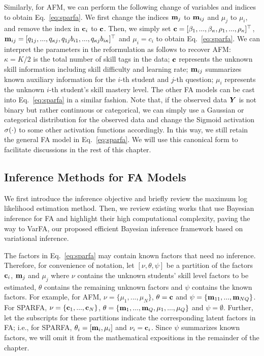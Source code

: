 Similarly, for AFM, we can perform the following change of variables and
indices to obtain Eq.~\ref{eq:sparfa}. We first change the indices ${\mathbf{m}}_j$ to
${\mathbf{m}}_{ij}$ and $\mu_j$ to $\mu_i$, and remove the index in ${\mathbf{c}}_i$ to ${\mathbf{c}}$.
Then, we simply set ${\mathbf{c}} = [\beta_1, ..., \beta_\kappa, \rho_1, ...,
    \rho_\kappa]^\top$, ${\mathbf{m}}_{ij} = [q_{1j},...,q_{\kappa j},
    q_{1j}b_{i1},...,q_{\kappa j}b_{i\kappa}]^\top$ and $\mu_{i} = c_i$ to
obtain Eq.~\ref{eq:sparfa}. We can interpret the parameters in the
reformulation as follows to recover AFM: $\kappa=K/2$ is the total number of
skill tags in the data; ${\mathbf{c}}$ represents the unknown skill information
including skill difficulty and learning rate; ${\mathbf{m}}_{ij}$ summarizes known
auxiliary information for the $i$-th student and $j$-th question; $\mu_i$
represents the unknown $i$-th student's skill mastery level. The other FA
models can be cast into Eq.~\ref{eq:sparfa} in a similar fashion. Note that, if
the observed data ${\bm{Y}}$ is not binary but rather continuous or categorical, we
can simply use a Gaussian or categorical distribution for the observed data and
change the Sigmoid activation $\sigma(\cdot)$ to some other activation
functions accordingly. In this way, we still retain the general FA model in
Eq.~\ref{eq:sparfa}. We will use this canonical form to facilitate discussions
in the rest of this chapter.
\subsection{Inference Methods for FA Models} \label{sec:FA-inference}
We first introduce the inference objective and briefly review the maximum log
likelihood estimation method. Then, we review existing works that use Bayesian
inference for FA and highlight their high computational complexity, paving the
way to VarFA, our proposed efficient Bayesian inference framework based on
variational inference.

The factors in Eq.~\ref{eq:sparfa} may contain known factors that need no
inference. Therefore, for convenience of notation, let $[\nu, \theta, \psi]$ be
a partition of the factors ${\mathbf{c}}_i$, ${\mathbf{m}}_j$ and $\mu_j$ where $\nu$ contains
the unknown students' skill level factors to be estimated, $\theta$ contains
the remaining unknown factors and $\psi$ contains the known factors. For
example, for AFM, $\nu = \{\mu_1,...,\mu_N \}$, $\theta={\mathbf{c}}$ and $\psi =
    \{{\mathbf{m}}_{11}, ..., {\mathbf{m}}_{NQ}\}$. For SPARFA, $\nu = \{{\mathbf{c}}_1,...,{\mathbf{c}}_N\}$,
$\theta = \{{\mathbf{m}}_1, ...,{\mathbf{m}}_Q, \mu_1,...,\mu_Q\}$ and $\psi = \emptyset$.
Further, let the subscripts for these partitions indicate the corresponding
latent factors in FA; i.e., for SPARFA, $\theta_i = [{\mathbf{m}}_i, \mu_i]$ and $\nu_i
    = {\mathbf{c}}_i$. Since $\psi$ summarizes known factors, we will omit it from the
mathematical expositions in the remainder of the chapter.

